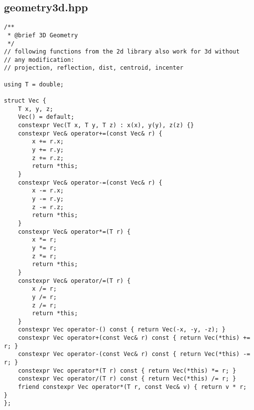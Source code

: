 \subsection{geometry3d.hpp}

\begin{small}
\begin{markdown}

\end{markdown}
\end{small}

\begin{lstlisting}
/**
 * @brief 3D Geometry
 */
// following functions from the 2d library also work for 3d without
// any modification:
// projection, reflection, dist, centroid, incenter

using T = double;

struct Vec {
    T x, y, z;
    Vec() = default;
    constexpr Vec(T x, T y, T z) : x(x), y(y), z(z) {}
    constexpr Vec& operator+=(const Vec& r) {
        x += r.x;
        y += r.y;
        z += r.z;
        return *this;
    }
    constexpr Vec& operator-=(const Vec& r) {
        x -= r.x;
        y -= r.y;
        z -= r.z;
        return *this;
    }
    constexpr Vec& operator*=(T r) {
        x *= r;
        y *= r;
        z *= r;
        return *this;
    }
    constexpr Vec& operator/=(T r) {
        x /= r;
        y /= r;
        z /= r;
        return *this;
    }
    constexpr Vec operator-() const { return Vec(-x, -y, -z); }
    constexpr Vec operator+(const Vec& r) const { return Vec(*this) += r; }
    constexpr Vec operator-(const Vec& r) const { return Vec(*this) -= r; }
    constexpr Vec operator*(T r) const { return Vec(*this) *= r; }
    constexpr Vec operator/(T r) const { return Vec(*this) /= r; }
    friend constexpr Vec operator*(T r, const Vec& v) { return v * r; }
};


\end{lstlisting}

